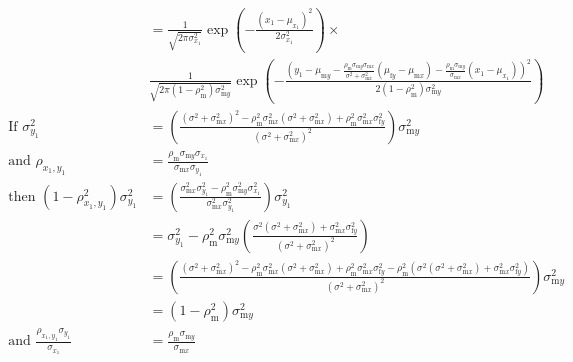 \documentclass{article}
\newcommand{\x}[1]{\text{#1}}
\begin{document}
\begin{align*}
\\&=\frac{1}{\sqrt{2\pi\sigma_{x_1}^2}}\exp\left(-\frac{(x_1-\mu_{x_1})^2}{2\sigma_{x_1}^2}\right)\times
\\&\frac{1}{\sqrt{2\pi(1-\rho_\x{m}^2)\sigma_{\x{m}y}^2}}\exp\left(-\frac{\left(y_1-\mu_{\x{m}y}-\frac{\rho_\x{m}\sigma_{\x{m}y}\sigma_{\x{m}x}}{\sigma^2+\sigma_{\x{m}x}^2}(\mu_{\x{f}y}-\mu_{\x{m}x})-\frac{\rho_\x{m}\sigma_{\x{m}y}}{\sigma_{\x{m}x}}(x_1-\mu_{x_1})\right)^2}{2(1-\rho_\x{m}^2)\sigma_{\x{m}y}^2}\right)
\\ \text{ If } \sigma_{y_1}^2&=\left(\frac{(\sigma^2+\sigma_{\x{m}x}^2)^2-\rho_\x{m}^2\sigma_{\x{m}x}^2(\sigma^2+\sigma_{\x{m}x}^2)+\rho_\x{m}^2\sigma_{\x{m}x}^2\sigma_{\x{f}y}^2}{(\sigma^2+\sigma_{\x{m}x}^2)^2}\right)\sigma_{\x{m}y}^2
\\\text{ and } \rho_{x_1,y_1}&=\frac{\rho_\x{m}\sigma_{\x{m}y}\sigma_{x_1}}{\sigma_{\x{m}x}\sigma_{y_1}}
\\ \text{ then } (1-\rho_{x_1,y_1}^2)\sigma_{y_1}^2&=\left(\frac{\sigma_{\x{m}x}^2\sigma_{y_1}^2-\rho_\x{m}^2\sigma_{\x{m}y}^2\sigma_{x_1}^2}{\sigma_{\x{m}x}^2\sigma_{y_1}^2}\right)\sigma_{y_1}^2
\\&=\sigma_{y_1}^2-\rho_\x{m}^2\sigma_{\x{m}y}^2\left(\frac{\sigma^2(\sigma^2+\sigma_{\x{m}x}^2)+\sigma_{\x{m}x}^2\sigma_{\x{f}y}^2}{(\sigma^2+\sigma_{\x{m}x}^2)^2}\right)
\\&=\left(\frac{(\sigma^2+\sigma_{\x{m}x}^2)^2-\rho_\x{m}^2\sigma_{\x{m}x}^2(\sigma^2+\sigma_{\x{m}x}^2)+\rho_\x{m}^2\sigma_{\x{m}x}^2\sigma_{\x{f}y}^2-\rho_\x{m}^2(\sigma^2(\sigma^2+\sigma_{\x{m}x}^2)+\sigma_{\x{m}x}^2\sigma_{\x{f}y}^2)}{(\sigma^2+\sigma_{\x{m}x}^2)^2}\right)\sigma_{\x{m}y}^2
\\&=(1-\rho_\x{m}^2)\sigma_{\x{m}y}^2
\\ \text{ and } \frac{\rho_{x_1,y_1}\sigma_{y_1}}{\sigma_{x_1}}&=\frac{\rho_\x{m}\sigma_{\x{m}y}}{\sigma_{\x{m}x}}
\end{align*}
\end{document}
